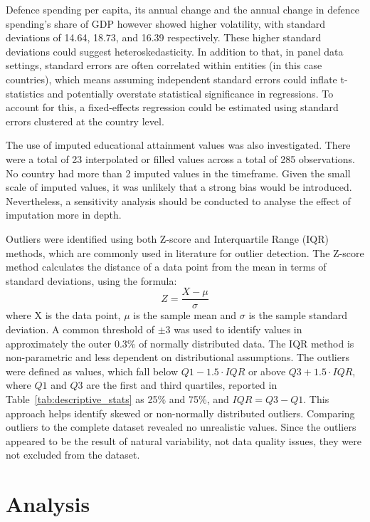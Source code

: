 Defence spending per capita, its annual change and the annual change in defence spending's 
share of GDP however showed higher volatility, with standard deviations of 14.64, 18.73, and 
16.39 respectively. These higher standard deviations could suggest heteroskedasticity. In addition 
to that, in panel data settings, standard errors are often correlated within entities (in this case countries), 
which means assuming independent standard errors could inflate t-statistics and potentially 
overstate statistical significance in regressions. To account for this, a fixed-effects 
regression could be estimated using standard errors clustered at the country level.

The use of imputed educational attainment values was also investigated. There were a total 
of 23 interpolated or filled values across a total of 285 observations. No country had
more than 2 imputed values in the timeframe. Given the small scale of imputed values, it was 
unlikely that a strong bias would be introduced. Nevertheless, a sensitivity analysis should 
be conducted to analyse the effect of imputation more in depth.

Outliers were identified using both Z-score and 
Interquartile Range (IQR) methods, which are commonly used in literature for outlier 
detection. The Z-score method calculates the distance of a data point from 
the mean in terms of standard deviations, using the formula:
\begin{equation*}
    Z = \frac{X - \mu}{\sigma}
\end{equation*}
where X is the data point, $\mu$ is the sample mean and $\sigma$ is the sample standard deviation.
A common threshold of $\pm 3$ was used to identify values in approximately the outer 0.3\% of normally 
distributed data.
The IQR method is non-parametric and less dependent on distributional assumptions. The outliers 
were defined as values, which fall below $Q1 - 1.5 \cdot IQR$ or above $Q3 + 1.5 \cdot IQR$, where 
$Q1$ and $Q3$ are the first and third quartiles, reported in Table~\ref{tab:descriptive_stats} as 
25\% and 75\%, and $IQR = Q3 - Q1$. This approach helps identify skewed or non-normally distributed outliers.
Comparing outliers to the complete dataset revealed no unrealistic 
values. Since the outliers appeared to be the result of natural variability, not data 
quality issues, they were not excluded from the dataset. \parencite{barnett_outliers_1994}

\section{Analysis}

